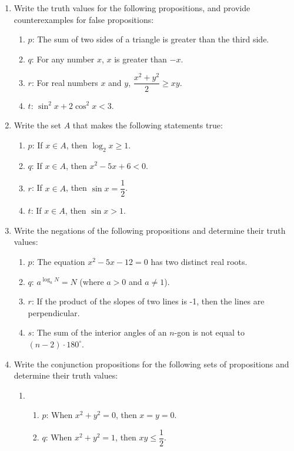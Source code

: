 \documentclass{report}
\newcounter{example}
\begin{document}
\begin{enumerate}[leftmargin=*]
    \item Write the truth values for the following propositions, and provide
          counterexamples for false propositions:
          \begin{enumerate}[label=,leftmargin=*]
              \item $p$: The sum of two sides of a triangle is greater than the third side.
              \item $q$: For any number $x$, $x$ is greater than $-x$.
              \item $r$: For real numbers $x$ and $y$, $\dfrac{x^2 + y^2}{2} \geq xy$.
              \item $t$: $\sin^2 x + 2\cos^2 x < 3$.
          \end{enumerate}

    \item Write the set $A$ that makes the following statements true:
          \begin{enumerate}[label=,leftmargin=*]
              \item $p$: If $x \in A$, then $\log_2 x \geq 1$.
              \item $q$: If $x \in A$, then $x^2 - 5x + 6 < 0$.
              \item $r$: If $x \in A$, then $\sin x = \dfrac{1}{2}$.
              \item $t$: If $x \in A$, then $\sin x > 1$.
          \end{enumerate}

    \item Write the negations of the following propositions and determine their truth
          values:
          \begin{enumerate}[label=,leftmargin=*]
              \item $p$: The equation $x^2 - 5x - 12 = 0$ has two distinct real roots.
              \item $q$: $a^{\log_a N} = N$ (where $a > 0$ and $a \neq 1$).
              \item $r$: If the product of the slopes of two lines is -1, then the lines are perpendicular.
              \item $s$: The sum of the interior angles of an $n$-gon is not equal to $(n-2) \cdot 180^{\circ}$.
          \end{enumerate}

    \item Write the conjunction propositions for the following sets of propositions and
          determine their truth values:
          \begin{enumerate}[label=(\alph*)]
              \item \begin{enumerate}[label=]
                        \item $p$: When $x^2 + y^2 = 0$, then $x = y = 0$.
                        \item $q$: When $x^2 + y^2 = 1$, then $xy \leq \dfrac{1}{2}$.
                    \end{enumerate}


\end{enumerate}
\end{enumerate}
\end{document}
